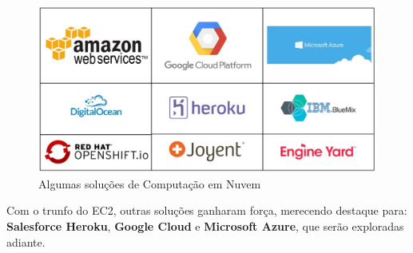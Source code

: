 \begin{figure}[h!]
  \centering
  \includegraphics[scale=0.40]{imagens/clouds.eps}
  \caption{Algumas soluções de Computação em Nuvem\cite{clouds}}
\end{figure}

Com o trunfo do EC2, outras soluções ganharam força, merecendo destaque para: \textbf{Salesforce Heroku}, \textbf{Google Cloud} e \textbf{Microsoft Azure}, que serão exploradas adiante.
